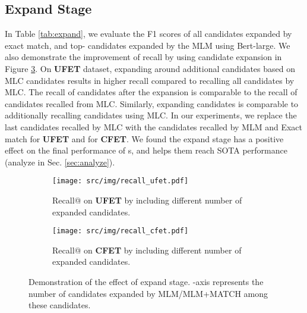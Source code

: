 \documentclass[11pt]{article}
\begin{document}
\subsection{Expand Stage}
\label{sec:expand}
In Table \ref{tab:expand}, we evaluate the F1 scores of all candidates expanded by exact match, and top- candidates expanded by the MLM using Bert-large. We also demonstrate the improvement of recall by using candidate expansion in Figure \ref{fig:expand_improvement}. On {\bf \textsc{UFET}} dataset, expanding around  additional candidates based on  MLC candidates results in  higher recall compared to recalling all  candidates by MLC. The recall of  candidates after the expansion is comparable to the recall of  candidates recalled from MLC. Similarly, expanding  candidates is comparable to additionally recalling  candidates using MLC.
In our experiments, we replace the last  candidates recalled by MLC with the candidates recalled by MLM and Exact match for {\bf \textsc{UFET}} and  for {\bf \textsc{CFET}}. We found the expand stage has a positive effect on the final performance of {\bf \textsc{\name}}s, and helps them reach SOTA performance (analyze in Sec. \ref{sec:analyze}).


\begin{table}[t]
\centering
{}
\caption{Evaluation of the recalled candidates.}
\label{tab:expand}
\end{table}
\begin{figure}[t]
     \centering
     \begin{subfigure}[h]{0.45\textwidth}
         \centering
         \texttt{[image: src/img/recall\_ufet.pdf]}
         \caption{Recall@ on {\bf \textsc{UFET}} by including different number of expanded candidates. }
         \label{fig:c1}
     \end{subfigure}
     \vfill
     \begin{subfigure}[h]{0.45\textwidth}
         \centering
         \texttt{[image: src/img/recall\_cfet.pdf]}
         \caption{Recall@ on {\bf \textsc{CFET}} by including different number of expanded candidates.}
         \label{fig:c2}
     \end{subfigure}
\caption{Demonstration of the effect of expand stage. -axis represents the number of candidates expanded by MLM/MLM+MATCH among these  candidates. }
\label{fig:expand_improvement}
\end{figure}
\label{sec:exp_expand}
\end{document}

